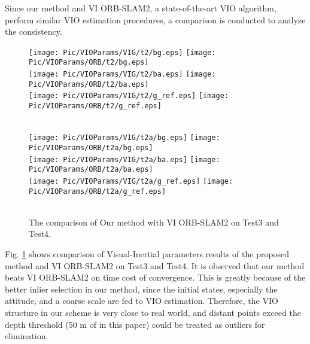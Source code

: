 \documentclass[journal,article,submit,moreauthors,pdftex]{Definitions/mdpi}
\begin{document}
Since our method and VI ORB-SLAM2, a state-of-the-art VIO algorithm, 
perform similar VIO estimation procedures, a comparison is conducted 
to analyze the consistency.
\begin{figure}[H]
	\centering
	\texttt{[image: Pic/VIOParams/VIG/t2/bg.eps]}
	\texttt{[image: Pic/VIOParams/ORB/t2/bg.eps]} \\
	\texttt{[image: Pic/VIOParams/VIG/t2/ba.eps]}
	\texttt{[image: Pic/VIOParams/ORB/t2/ba.eps]} \\
	\texttt{[image: Pic/VIOParams/VIG/t2/g\_ref.eps]}
	\texttt{[image: Pic/VIOParams/ORB/t2/g\_ref.eps]} \\
	 \\
\end{figure}
\begin{figure}[H]
	\centering
	\texttt{[image: Pic/VIOParams/VIG/t2a/bg.eps]}
	\texttt{[image: Pic/VIOParams/ORB/t2a/bg.eps]} \\
	\texttt{[image: Pic/VIOParams/VIG/t2a/ba.eps]}
	\texttt{[image: Pic/VIOParams/ORB/t2a/ba.eps]} \\
	\texttt{[image: Pic/VIOParams/VIG/t2a/g\_ref.eps]}
	\texttt{[image: Pic/VIOParams/ORB/t2a/g\_ref.eps]} \\
	 \\
	\caption{The comparison of Our method with VI ORB-SLAM2 on Test3 and Test4.}
	\label{VIOParam4}
\end{figure}


Fig. \ref{VIOParam4} shows comparison of Visual-Inertial parameters 
results of the proposed method and VI ORB-SLAM2 on Test3 and Test4. 
It is observed that our method beats VI ORB-SLAM2 on time cost of 
convergence.
This is greatly because of the better inlier selection in our method,
since the initial states, especially the attitude, and a coarse scale 
are fed to VIO estimation.
Therefore, the VIO structure in our scheme is very close to real world, 
and distant points exceed the depth threshold (50 m of in this paper) could 
be treated as outliers for elimination.
\end{document}
